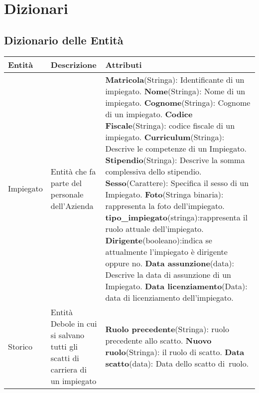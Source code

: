 \section{Dizionari}

\subsection{Dizionario delle Entità}
\begin{table}[h!]
    \centering
    \begin{tabular}{|p{}|p{}|p{}|}
        \hline
        
        \textbf{Entità} & \textbf{Descrizione} & \textbf{Attributi} \\ \hline
        
        Impiegato & Entità che fa parte del personale dell'Azienda & 
        \textbf{Matricola}(Stringa): Identificante di un \mbox{impiegato.}\newline
        \textbf{Nome}(Stringa): Nome di un impiegato.\newline
        \textbf{Cognome}(Stringa): Cognome di un impiegato.\newline
        \textbf{Codice Fiscale}(Stringa): codice fiscale di un impiegato.\newline
        \textbf{Curriculum}(Stringa): Descrive le competenze di un Impiegato.\newline
        \textbf{Stipendio}(Stringa): Descrive la somma complessiva dello stipendio.\newline
        \textbf{Sesso}(Carattere): Specifica il sesso di un Impiegato.\newline
        \textbf{Foto}(Stringa binaria): rappresenta la foto dell'impiegato.\newline
        \textbf{tipo\_impiegato}(stringa):rappresenta il ruolo attuale dell'impiegato.\newline
        \textbf{Dirigente}(booleano):indica se attualmente l'impiegato è dirigente oppure no.\newline
        \textbf{Data assunzione}(data): Descrive la data di assunzione di un Impiegato.\newline
        \textbf{Data licenziamento}(Data): data di licenziamento dell'impiegato.\newline
        \\ \hline
        Storico & Entità Debole in cui si salvano tutti gli scatti di carriera di un impiegato & 
        \textbf{Ruolo precedente}(Stringa): ruolo precedente allo scatto.\newline
        \textbf{Nuovo ruolo}(Stringa): il ruolo di scatto.\newline
        \textbf{Data scatto}(data): Data dello scatto \mbox{di ruolo.}\newline
        \\ \hline

    \end{tabular}
\end{table}

